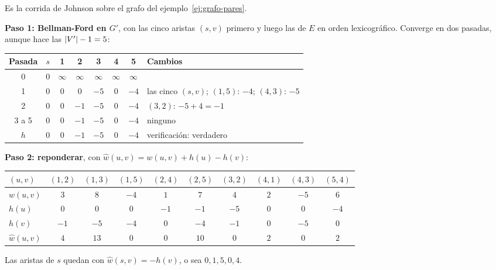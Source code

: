 \documentclass[11pt,letterpaper]{article}
\begin{document}
\begin{ejemplo}
  \label{ej:johnson-cormen}
  Es la corrida de Johnson sobre el grafo del
  ejemplo~\ref{ej:grafo-pares}.

  \textbf{Paso 1: Bellman-Ford en $G'$}, con las cinco aristas
  $(s, v)$ primero y luego las de $E$ en orden lexicográfico. Converge
  en dos pasadas, aunque hace las $\left\lvert V' \right\rvert - 1 = 5$:
  \begin{center}
  \small
  \begin{tabular}{cccccccl}
    \toprule
    \textbf{Pasada} & $s$ & 1 & 2 & 3 & 4 & 5 & \textbf{Cambios} \\
    \midrule
    0 & $0$ & $\infty$ & $\infty$ & $\infty$ & $\infty$ & $\infty$ & \\
    1 & $0$ & $0$ & $0$ & $-5$ & $0$ & $-4$
      & las cinco $(s, v)$; $(1, 5)$: $-4$; $(4, 3)$: $-5$ \\
    2 & $0$ & $0$ & $-1$ & $-5$ & $0$ & $-4$ & $(3, 2)$: $-5 + 4 = -1$ \\
    3 a 5 & $0$ & $0$ & $-1$ & $-5$ & $0$ & $-4$ & ninguno \\
    \midrule
    $h$ & $0$ & $0$ & $-1$ & $-5$ & $0$ & $-4$
      & verificación: verdadero \\
    \bottomrule
  \end{tabular}
  \end{center}

  \textbf{Paso 2: reponderar}, con
  $\hat{w}(u, v) = w(u, v) + h(u) - h(v)$:
  \begin{center}
  \small
  \setlength{\tabcolsep}{4.5pt}
  \begin{tabular}{lccccccccc}
    \toprule
    $(u, v)$ & $(1, 2)$ & $(1, 3)$ & $(1, 5)$ & $(2, 4)$ & $(2, 5)$
      & $(3, 2)$ & $(4, 1)$ & $(4, 3)$ & $(5, 4)$ \\
    \midrule
    $w(u, v)$ & $3$ & $8$ & $-4$ & $1$ & $7$ & $4$ & $2$ & $-5$ & $6$ \\
    $h(u)$ & $0$ & $0$ & $0$ & $-1$ & $-1$ & $-5$ & $0$ & $0$ & $-4$ \\
    $h(v)$ & $-1$ & $-5$ & $-4$ & $0$ & $-4$ & $-1$ & $0$ & $-5$ & $0$ \\
    \midrule
    $\hat{w}(u, v)$ & $4$ & $13$ & $0$ & $0$ & $10$ & $0$ & $2$ & $0$
      & $2$ \\
    \bottomrule
  \end{tabular}
  \end{center}
  Las aristas de $s$ quedan con $\hat{w}(s, v) = -h(v)$, o sea
  $0, 1, 5, 0, 4$.


\end{ejemplo}
\end{document}
